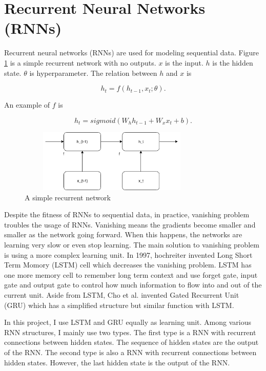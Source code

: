 \documentclass[modernstyle,12pt]{sjsuthesis}
\theoremstyle{definition}
\begin{document}
\section{Recurrent Neural Networks (RNNs)}\label{sect:rnn}

Recurrent neural networks (RNNs) \cite{rumelhart1986learning} are used for modeling sequential data. Figure \ref{f:rnnWithNoOutputs} is a simple recurrent network with no outputs. $x$ is the input. $h$ is the hidden state. $\theta$ is hyperparameter. The relation between $h$ and $x$ is

$$h_t = f(h_{t-1}, x_t; \theta).$$

An example of $f$ is

$$h_t = sigmoid(W_h h_{t-1} + W_x x_t + b).$$

\begin{figure}[htbp]\centering
  \includegraphics[width=9cm, height=3cm]{figures/rnnWithNoOutputs}
  \caption{A simple recurrent network}
  \label{f:rnnWithNoOutputs}
\end{figure}



Despite the fitness of RNNs to sequential data, in practice, vanishing problem troubles the usage of RNNs. Vanishing means the gradients become smaller and smaller as the network going forward. When this happens, the networks are learning very slow or even stop learning. The main solution to vanishing problem is using a more complex learning unit. In 1997, hochreiter invented Long Short Term Momory (LSTM) cell \cite{hochreiter1997long} which decreases the vanishing problem. LSTM has one more memory cell to remember long term context and use forget gate, input gate and output gate to control how much information to flow into and out of the current unit. Aside from LSTM, Cho et al. invented Gated Recurrent Unit (GRU)\cite{cho2014learning} which has a simplified structure but similar function with LSTM.


In this project, I use LSTM and GRU equally as learning unit. Among various RNN structures, I mainly use two types. The first type is a RNN with recurrent connections between hidden states. The sequence of hidden states are the output of the RNN. The second type is also a RNN with recurrent connections between hidden states. However, the last hidden state is the output of the RNN.
\end{document}
